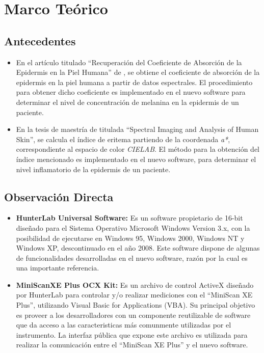 \chapter{\label{cap:2}Marco Te\'{o}rico}

	\section{Antecedentes}	
		\begin{itemize}
			\item En el art\'{i}culo titulado ``Recuperaci\'{o}n del Coeficiente de Absorci\'{o}n de la Epidermis en la Piel Humana'' de \cite{FreddyNarea-absorcion}, se obtiene el coeficiente de absorci\'{o}n de la epidermis en la piel humana a partir de datos espectrales. El procedimiento para obtener dicho coeficiente es implementado en el nuevo software para determinar el nivel de concentraci\'{o}n de melanina en la epidermis de un paciente.
			
			\item En la tesis de maestr\'{i}a de \cite{Bersha} titulada ``Spectral Imaging and Analysis of Human Skin'', se calcula el \'{i}ndice de eritema partiendo de la coordenada \textit{a*}, correspondiente al espacio de color \textit{CIELAB}. El m\'{e}todo para la obtenci\'{o}n del \'{i}ndice mencionado es implementado en el nuevo software, para determinar el nivel inflamatorio de la epidermis de un paciente.
		\end{itemize}

	\section{Observaci\'{o}n Directa}
		\begin{itemize}
			\item \textbf{HunterLab Universal Software:} Es un software propietario de 16-bit dise\~{n}ado para el Sistema Operativo Microsoft Windows Version 3.x, con la posibilidad de ejecutarse en Windows 95, Windows 2000, Windows NT y Windows XP, descontinuado en el a\~{n}o 2008. Este software dispone de algunas de funcionalidades desarrolladas en el nuevo software, raz\'{o}n por la cual es una importante referencia.
		
			\item \textbf{MiniScanXE Plus OCX Kit:} Es un archivo de control ActiveX dise\~{n}ado por HunterLab para controlar y/o realizar mediciones con el ``MiniScan XE Plus'', utilizando Visual Basic for Applications (VBA). Su principal objetivo es proveer a los desarrolladores con un componente reutilizable de software que da acceso a las caracteristicas m\'{a}s comunmente utilizadas por el instrumento. La interfaz p\'{u}blica que expone este archivo es utilizada para realizar la comunicaci\'{o}n entre el ``MiniScan XE Plus'' y el nuevo software.
		\end{itemize}